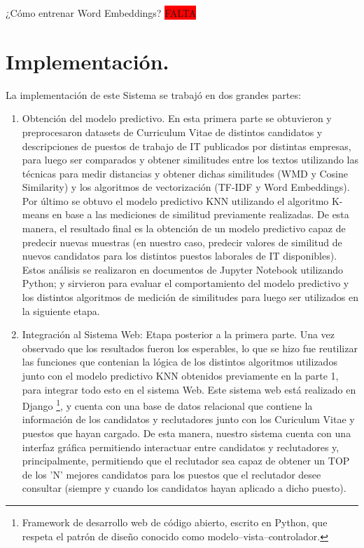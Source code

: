 \documentclass[12pt,a4paper]{article}
\makeatletter
\renewcommand\paragraph{\@startsection{paragraph}{4}{\z@}
            {-2.5ex\@plus -1ex \@minus -.25ex}
            {1.25ex \@plus .25ex}
            {\normalfont\normalsize\bfseries}}
\makeatother
\begin{document}
\paragraph{¿Cómo entrenar Word Embeddings?}
\colorbox{red}{FALTA}

\cleardoublepage

\section{Implementación.}\label{5.Implementacion}

La implementación de este Sistema se trabajó en dos grandes partes:
\begin{enumerate}
\item Obtención del modelo predictivo. En esta primera parte se obtuvieron y preprocesaron datasets de Curriculum Vitae de distintos candidatos y descripciones de puestos de trabajo de IT publicados por distintas empresas, para luego ser comparados y obtener similitudes entre los textos utilizando las técnicas para medir distancias y obtener dichas similitudes (WMD y Cosine Similarity) y los algoritmos de vectorización (TF-IDF y Word Embeddings).\\
Por último se obtuvo el modelo predictivo KNN utilizando el algoritmo K-means en base a las mediciones de similitud previamente realizadas. De esta manera, el resultado final es la obtención de un modelo predictivo capaz de predecir nuevas muestras (en nuestro caso, predecir valores de similitud de nuevos candidatos para los distintos puestos laborales de IT disponibles). \\
Estos análisis se realizaron en documentos de Jupyter Notebook utilizando Python; y sirvieron para evaluar el comportamiento del modelo predictivo y los distintos algoritmos de medición de similitudes para luego ser utilizados en la siguiente etapa. 
\item Integración al Sistema Web: Etapa posterior a la primera parte. Una vez observado que los resultados fueron los esperables, lo que se hizo fue reutilizar las funciones que contenian la lógica de los distintos algoritmos utilizados junto con el modelo predictivo KNN obtenidos previamente en la parte 1, para integrar todo esto en el sistema Web. Este sistema web está realizado en Django \footnote{Framework de desarrollo web de código abierto, escrito en Python, que respeta el patrón de diseño conocido como modelo–vista–controlador.}, y cuenta con una base de datos relacional que contiene la información de los candidatos y reclutadores junto con los Curiculum Vitae y puestos que hayan cargado. De esta manera, nuestro sistema cuenta con una interfaz gráfica permitiendo interactuar entre candidatos y reclutadores y, principalmente, permitiendo que el reclutador sea capaz de obtener un TOP de los 'N' mejores candidatos para los puestos que el reclutador desee consultar (siempre y cuando los candidatos hayan aplicado a dicho puesto). 
\end{enumerate}
\end{document}
